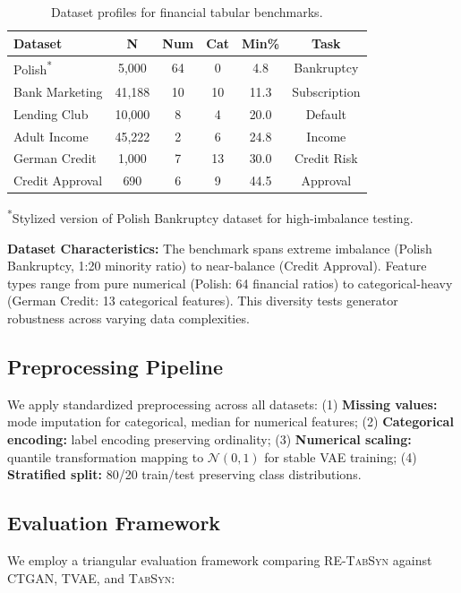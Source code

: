 \documentclass[conference]{IEEEtran}
\newcommand{\retabsyn}{\textsc{RE-TabSyn}}
\newcommand{\tabsyn}{\textsc{TabSyn}}
\newcommand{\ctgan}{\textsc{CTGAN}}
\begin{document}
\begin{table}[htbp]
\caption{Dataset profiles for financial tabular benchmarks.}
\label{tab:datasets}
\centering
\small
\begin{tabular}{lccccc}
\toprule
\textbf{Dataset} & \textbf{N} & \textbf{Num} & \textbf{Cat} & \textbf{Min\%} & \textbf{Task} \\
\midrule
Polish\textsuperscript{*} & 5,000 & 64 & 0 & 4.8 & Bankruptcy \\
Bank Marketing & 41,188 & 10 & 10 & 11.3 & Subscription \\
Lending Club & 10,000 & 8 & 4 & 20.0 & Default \\
Adult Income & 45,222 & 2 & 6 & 24.8 & Income \\
German Credit & 1,000 & 7 & 13 & 30.0 & Credit Risk \\
Credit Approval & 690 & 6 & 9 & 44.5 & Approval \\
\bottomrule
\end{tabular}
\end{table}
\small \textsuperscript{*}Stylized version of Polish Bankruptcy dataset for high-imbalance testing.

\textbf{Dataset Characteristics:} The benchmark spans extreme imbalance (Polish Bankruptcy, 1:20 minority ratio) to near-balance (Credit Approval). Feature types range from pure numerical (Polish: 64 financial ratios) to categorical-heavy (German Credit: 13 categorical features). This diversity tests generator robustness across varying data complexities.

\subsection{Preprocessing Pipeline}
We apply standardized preprocessing across all datasets: (1) \textbf{Missing values:} mode imputation for categorical, median for numerical features; (2) \textbf{Categorical encoding:} label encoding preserving ordinality; (3) \textbf{Numerical scaling:} quantile transformation mapping to $\mathcal{N}(0,1)$ for stable VAE training; (4) \textbf{Stratified split:} 80/20 train/test preserving class distributions.

\subsection{Evaluation Framework}
We employ a triangular evaluation framework comparing \retabsyn{} against \ctgan{}, TVAE, and \tabsyn{}:
\end{document}
